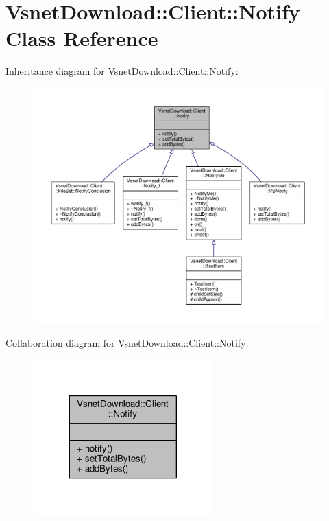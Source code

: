 \hypertarget{classVsnetDownload_1_1Client_1_1Notify}{}\section{Vsnet\+Download\+:\+:Client\+:\+:Notify Class Reference}
\label{classVsnetDownload_1_1Client_1_1Notify}


Inheritance diagram for Vsnet\+Download\+:\+:Client\+:\+:Notify\+:
\nopagebreak
\begin{figure}[H]
\begin{center}
\leavevmode
\includegraphics[width=350pt]{d5/d6a/classVsnetDownload_1_1Client_1_1Notify__inherit__graph}
\end{center}
\end{figure}


Collaboration diagram for Vsnet\+Download\+:\+:Client\+:\+:Notify\+:
\nopagebreak
\begin{figure}[H]
\begin{center}
\leavevmode
\includegraphics[width=197pt]{d6/db8/classVsnetDownload_1_1Client_1_1Notify__coll__graph}
\end{center}
\end{figure}

